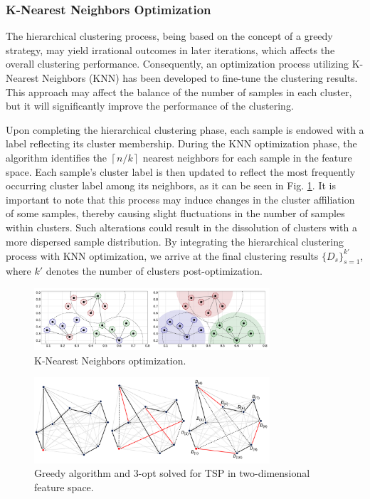 \documentclass[lettersize,journal]{IEEEtran}
\begin{document}
\subsubsection{K-Nearest Neighbors Optimization}
The hierarchical clustering process, being based on the concept 
of a greedy strategy, may yield irrational outcomes in later 
iterations, which affects the overall clustering performance. 
Consequently, an optimization process utilizing K-Nearest 
Neighbors (KNN) has been developed to fine-tune the clustering 
results. This approach may affect the balance of the number of 
samples in each cluster, but it will significantly improve the 
performance of the clustering.

Upon completing the hierarchical clustering phase, each sample 
is endowed with a label reflecting its cluster membership. 
During the KNN optimization phase, the algorithm identifies 
the $\left\lceil n/k\right\rceil$ nearest neighbors for each 
sample in the feature space. Each sample's cluster label is then 
updated to reflect the most frequently occurring cluster label 
among its neighbors, as it can be seen in Fig. \ref{Fig3}. It is important to note that this process 
may induce changes in the cluster affiliation of some samples, 
thereby causing slight fluctuations in the number of samples 
within clusters. Such alterations could result in the dissolution 
of clusters with a more dispersed sample distribution. By 
integrating the hierarchical clustering process with KNN 
optimization, we arrive at the final clustering results 
$\{D_s\}_{s=1}^{k'}$, where $k'$ denotes the number of clusters 
post-optimization.

\begin{figure}[!t]
  \centering
  \includegraphics[width=3.45in]{Fig3.png}
  \caption{K-Nearest Neighbors optimization.}
  \label{Fig3}
\end{figure}

\begin{figure}[!t]
  \centering
  \includegraphics[width=3.45in]{Fig4.png}
  \caption{Greedy algorithm and 3-opt solved for TSP in 
  two-dimensional feature space.}
  \label{Fig4}
\end{figure}
\end{document}

